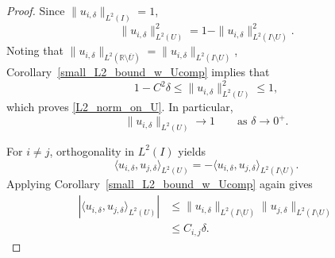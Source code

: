 \documentclass[preprint,12pt]{elsarticle}
\newcommand{\R}{\mathbb R}
\begin{document}
\begin{proof}
Since $\|u_{i,\delta}\|_{L^2(I)}=1$,
\[
    \|u_{i,\delta}\|_{L^2(U)}^2
    =
    1-\|u_{i,\delta}\|_{L^2(I\setminus U)}^2.
\]
Noting that $\|u_{i,\delta}\|_{L^2(\R\setminus\overline{U})}=
    \|u_{i,\delta}\|_{L^2(I\setminus U)}$, Corollary~\ref{small_L2_bound_w_Ucomp} implies that
\[
    1-C^2\delta
    \leq
    \|u_{i,\delta}\|_{L^2(U)}^2
    \leq1,
\]
which proves \eqref{L2_norm_on_U}. In particular,
\[
    \|u_{i,\delta}\|_{L^2(U)}
    \longrightarrow1
    \qquad\text{as }\delta\to0^+.
\]

For $i\neq j$, orthogonality in $L^2(I)$ yields
\[
    \langle u_{i,\delta},u_{j,\delta}\rangle_{L^2(U)}
    =
    -
    \langle u_{i,\delta},u_{j,\delta}\rangle_{L^2(I\setminus U)}.
\]
Applying Corollary~\ref{small_L2_bound_w_Ucomp} again gives
\begin{align*}
    \left|
    \langle u_{i,\delta},u_{j,\delta}\rangle_{L^2(U)}
    \right|
    &\leq
    \|u_{i,\delta}\|_{L^2(I\setminus U)}
    \|u_{j,\delta}\|_{L^2(I\setminus U)}\\
    &\leq C_{i,j}\delta.
\end{align*}
\end{proof}
\end{document}
